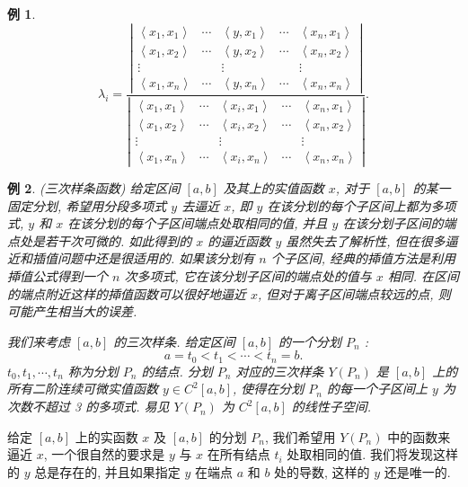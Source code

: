 \documentclass[openany]{ctexbook}
\theoremstyle{kaiti}
\theoremstyle{normal}
\newtheorem{example}{例}[section]
\begin{document}
\begin{example}
$$
\lambda_{i}=\frac{\left|\begin{array}{ccccc}
\left\langle x_1, x_1\right\rangle & \cdots & \left\langle y, x_1\right\rangle & \cdots & \left\langle x_n, x_1\right\rangle \\
\left\langle x_1, x_2\right\rangle & \cdots & \left\langle y, x_2\right\rangle & \cdots & \left\langle x_n, x_2\right\rangle \\
\vdots & & \vdots & & \vdots \\
\left\langle x_1, x_n\right\rangle & \cdots & \left\langle y, x_n\right\rangle & \cdots & \left\langle x_n, x_n\right\rangle
\end{array}\right|}{\left|\begin{array}{ccccc}
\left\langle x_1, x_1\right\rangle & \cdots & \left\langle x_{i}, x_1\right\rangle & \cdots & \left\langle x_n, x_1\right\rangle \\
\left\langle x_1, x_2\right\rangle & \cdots & \left\langle x_{i}, x_2\right\rangle & \cdots & \left\langle x_n, x_2\right\rangle \\
\vdots & & \vdots & & \vdots \\
\left\langle x_1, x_n\right\rangle & \cdots & \left\langle x_{i}, x_n\right\rangle & \cdots & \left\langle x_n, x_n\right\rangle
\end{array}\right|} .
$$
\end{example}

\begin{example}
(三次样条函数) 给定区间 $[a, b]$ 及其上的实值函数 $x$, 对于 $[a, b]$ 的某一固定分划, 希望用分段多项式 $y$ 去逼近 $x$, 即 $y$ 在该分划的每个子区间上都为多项式, $y$ 和 $x$ 在该分划的每个子区间端点处取相同的值, 并且 $y$ 在该分划子区间的端点处是若干次可微的. 如此得到的 $x$ 的逼近函数 $y$ 虽然失去了解析性, 但在很多逼近和插值问题中还是很适用的. 如果该分划有 $n$ 个子区间, 经典的揷值方法是利用揷值公式得到一个 $n$ 次多项式, 它在该分划子区间的端点处的值与 $x$ 相同. 在区间的端点附近这样的揷值函数可以很好地逼近 $x$, 但对于离子区间端点较远的点, 则可能产生相当大的误差.

我们来考虑 $[a, b]$ 的三次样条. 给定区间 $[a, b]$ 的一个分划 $P_n$ :
$$
a=t_0<t_1<\cdots<t_n=b.
$$
$t_0, t_1, \cdots, t_n$ 称为分划 $P_n$ 的结点. 分划 $P_n$ 对应的三次样条 $Y\left(P_n\right)$ 是 $[a, b]$ 上的所有二阶连续可微实值函数 $y \in C^2[a, b]$, 使得在分划 $P_n$ 的每一个子区间上 $y$ 为次数不超过 3 的多项式. 易见 $Y\left(P_n\right)$ 为 $C^2[a, b]$ 的线性子空间.
\end{example}

给定 $[a, b]$ 上的实函数 $x$ 及 $[a, b]$ 的分划 $P_n$, 我们希望用 $Y\left(P_n\right)$ 中的函数来逼近 $x$, 一个很自然的要求是 $y$ 与 $x$ 在所有结点 $t_{i}$ 处取相同的值. 我们将发现这样的 $y$ 总是存在的, 并且如果指定 $y$ 在端点 $a$ 和 $b$ 处的导数, 这样的 $y$ 还是唯一的.
\end{document}
